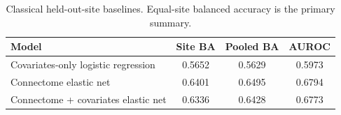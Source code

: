 \begin{table}[!t]
\centering
\caption{Classical held-out-site baselines. Equal-site balanced accuracy is the primary summary.}
\label{tab:baselines}
\footnotesize
\begin{tabularx}{\columnwidth}{Xccc}
\toprule
Model & Site BA & Pooled BA & AUROC \\
\midrule
Covariates-only logistic regression & 0.5652 & 0.5629 & 0.5973 \\
Connectome elastic net & 0.6401 & 0.6495 & 0.6794 \\
Connectome + covariates elastic net & 0.6336 & 0.6428 & 0.6773 \\
\bottomrule
\end{tabularx}
\end{table}
